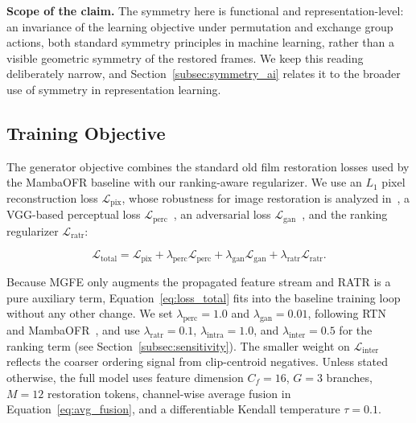 \textbf{Scope of the claim.} The symmetry here is functional and representation-level: an invariance of the learning objective under permutation and exchange group actions, both standard symmetry principles in machine learning, rather than a visible geometric symmetry of the restored frames. We keep this reading deliberately narrow, and Section~\ref{subsec:symmetry_ai} relates it to the broader use of symmetry in representation learning.

\subsection{Training Objective}
\label{subsec:training_objective}

The generator objective combines the standard old film restoration losses used by the MambaOFR baseline with our ranking-aware regularizer. We use an $L_1$ pixel reconstruction loss $\mathcal{L}_{\mathrm{pix}}$, whose robustness for image restoration is analyzed in~\cite{zhao2017loss_restoration}, a VGG-based perceptual loss $\mathcal{L}_{\mathrm{perc}}$~\cite{johnson2016perceptual}, an adversarial loss $\mathcal{L}_{\mathrm{gan}}$~\cite{goodfellow2014gan}, and the ranking regularizer $\mathcal{L}_{\mathrm{ratr}}$:

\begin{equation}
\mathcal{L}_{\mathrm{total}} =
\mathcal{L}_{\mathrm{pix}}
+ \lambda_{\mathrm{perc}}\mathcal{L}_{\mathrm{perc}}
+ \lambda_{\mathrm{gan}}\mathcal{L}_{\mathrm{gan}}
+ \lambda_{\mathrm{ratr}}\mathcal{L}_{\mathrm{ratr}}.
\label{eq:loss_total}
\end{equation}

Because MGFE only augments the propagated feature stream and RATR is a pure auxiliary term, Equation~\eqref{eq:loss_total} fits into the baseline training loop without any other change. We set $\lambda_{\mathrm{perc}}=1.0$ and $\lambda_{\mathrm{gan}}=0.01$, following RTN~\cite{wan2022rtn} and MambaOFR~\cite{mao2025mambaofr}, and use $\lambda_{\mathrm{ratr}}=0.1$, $\lambda_{\mathrm{intra}}=1.0$, and $\lambda_{\mathrm{inter}}=0.5$ for the ranking term (see Section~\ref{subsec:sensitivity}). The smaller weight on $\mathcal{L}_{\text{inter}}$ reflects the coarser ordering signal from clip-centroid negatives. Unless stated otherwise, the full model uses feature dimension $C_f=16$, $G=3$ branches, $M=12$ restoration tokens, channel-wise average fusion in Equation~\eqref{eq:avg_fusion}, and a differentiable Kendall temperature $\tau=0.1$.
